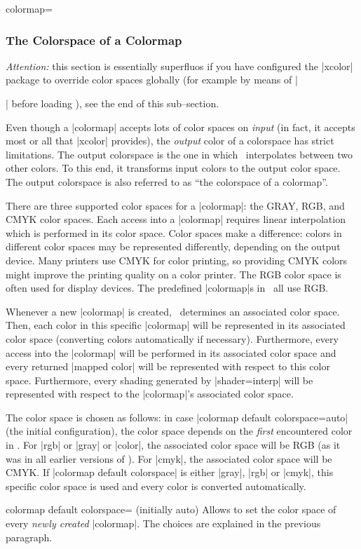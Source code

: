 \begin{pgfplotskey}{colormap=}
\subsubsection{The Colorspace of a Colormap}

\emph{Attention:} this section is essentially superfluos if you have configured the |xcolor| package to override color spaces globally (for example by means of |\usepackage[cmyk]{xcolor}| before loading \PGFPlots), see the end of this sub--section.

Even though a |colormap| accepts lots of color spaces on \emph{input} (in fact, it accepts most or all that |xcolor| provides), the \emph{output} color of a colorspace has strict limitations. The output colorspace is the one in which \PGFPlots\ interpolates between two other colors. To this end, it transforms input colors to the output color space. The output colorspace is also referred to as ``the colorspace of a colormap''.

There are three supported color spaces for a |colormap|: the GRAY, RGB, and CMYK color spaces. Each access into a |colormap| requires linear interpolation which is performed in its color space. Color spaces make a difference: colors in different color spaces may be represented differently, depending on the output device. Many printers use CMYK for color printing, so providing CMYK colors might improve the printing quality on a color printer. The RGB color space is often used for display devices. The predefined |colormap|s in \PGFPlots\ all use RGB.

Whenever a new |colormap| is created, \PGFPlots\ determines an associated color space. Then, each color in this specific |colormap| will be represented in its associated color space (converting colors automatically if necessary). Furthermore, every access into the |colormap| will be performed in its associated color space and every returned |mapped color| will be represented with respect to this color space. Furthermore, every shading generated by |shader=interp| will be represented with respect to the |colormap|'s associated color space. 

The color space is chosen as follows: in case |colormap default colorspace=auto| (the initial configuration), the color space depends on the \emph{first} encountered color in . For |rgb| or |gray| or |color|, the associated color space will be RGB (as it was in all earlier versions of \PGFPlots). For |cmyk|, the associated color space will be CMYK. If |colormap default colorspace| is either |gray|, |rgb| or |cmyk|, this specific color space is used and every color is converted automatically.
\begin{pgfplotskey}{colormap default colorspace= (initially auto)}
	Allows to set the color space of every \emph{newly created} |colormap|. The choices are explained in the previous paragraph.


\end{pgfplotskey}
\end{pgfplotskey}
